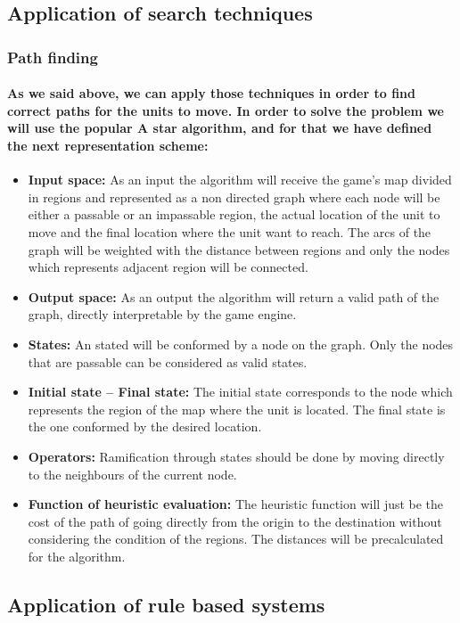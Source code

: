 \documentclass[a4paper,10pt]{article}
\newcommand{\p}[1]{\paragraph{\indent\textnormal{#1}}}
\begin{document}
  \subsection{Application of search techniques}

    \subsubsection{Path finding}
    \p{As we said above, we can apply those techniques in order to find correct paths for the units to move. In order to solve the problem we will use the popular A star algorithm, and for that we have defined the next representation scheme:}

    \begin{itemize}
     \item \textbf{Input space:} As an input the algorithm will receive the game's map divided in regions and represented as a non directed graph where each node will be either a passable or an impassable region, the actual location of the unit to move and the final location where the unit want to reach. The arcs of the graph will be weighted with the distance between regions and only the nodes which represents adjacent region will be connected.
     \item \textbf{Output space:} As an output the algorithm will return a valid path of the graph, directly interpretable by the game engine.
     \item \textbf{States:} An stated will be conformed by a node on the graph. Only the nodes that are passable can be considered as valid states. 
     \item \textbf{Initial state – Final state:} The initial state corresponds to the node which represents the region of the map where the unit is located. The final state is the one conformed by the desired location.
     \item \textbf{Operators:} Ramification through states should be done by moving directly to the neighbours of the current node.
     \item \textbf{Function of heuristic evaluation:} The heuristic function will just be the cost of the path of going directly from the origin to the destination without considering the condition of the regions. The distances will be precalculated for the algorithm.
    \end{itemize}

  \subsection{Application of rule based systems}
  
\end{document}
